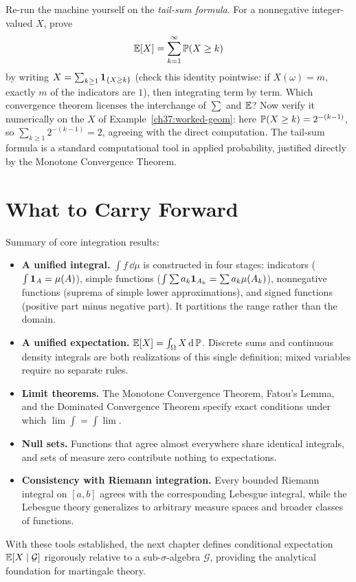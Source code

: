 \begin{labbox}
Re-run the machine yourself on the \emph{tail-sum formula}. For a nonnegative
integer-valued $X$, prove
\[
  \E[X]=\sum_{k=1}^\infty \P(X\ge k)
\]
by writing $X=\sum_{k\ge1}\ind_{\{X\ge k\}}$ (check this identity pointwise: if
$X(\omega)=m$, exactly $m$ of the indicators are $1$), then integrating term by
term. Which convergence theorem licenses the interchange of $\sum$ and $\E$? Now
verify it numerically on the $X$ of Example~\ref{ch37:worked-geom}: here
$\P(X\ge k)=2^{-(k-1)}$, so $\sum_{k\ge1}2^{-(k-1)}=2$, agreeing with the
direct computation. The tail-sum formula is a standard computational tool in
applied probability, justified directly by the Monotone Convergence Theorem.
\end{labbox}

\section{What to Carry Forward}

\begin{focusbox}
Summary of core integration results:
\begin{itemize}
\item \textbf{A unified integral.} $\int f\,\dd\mu$ is constructed in four stages:
  indicators ($\int\ind_A=\mu(A)$), simple functions
  ($\int\sum a_k\ind_{A_k}=\sum a_k\mu(A_k)$), nonnegative functions
  (suprema of simple lower approximations), and signed functions
  (positive part minus negative part). It partitions the range rather than the domain.
\item \textbf{A unified expectation.} $\E[X]=\int_\Omega X\,\dd\P$. Discrete sums
  and continuous density integrals are both realizations of this single definition;
  mixed variables require no separate rules.
\item \textbf{Limit theorems.} The Monotone Convergence Theorem, Fatou's Lemma,
  and the Dominated Convergence Theorem specify exact conditions under which
  $\lim\int=\int\lim$.
\item \textbf{Null sets.} Functions that agree almost everywhere share identical
  integrals, and sets of measure zero contribute nothing to expectations.
\item \textbf{Consistency with Riemann integration.} Every bounded Riemann integral
  on $[a,b]$ agrees with the corresponding Lebesgue integral, while the Lebesgue theory
  generalizes to arbitrary measure spaces and broader classes of functions.
\end{itemize}
With these tools established, the next chapter defines conditional expectation
$\E[X\given\mathcal G]$ rigorously relative to a sub-$\sigma$-algebra $\mathcal{G}$,
providing the analytical foundation for martingale theory.
\end{focusbox}

